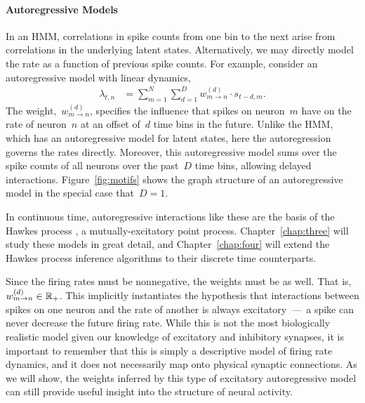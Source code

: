 \paragraph{Autoregressive Models}
In an HMM, correlations in spike counts from one bin to the next arise from 
correlations in the underlying latent states. Alternatively, we may directly 
model the rate as a function of previous spike counts. For example, consider 
an autoregressive model with linear dynamics,
\begin{align}
  \label{eq:ar_model}
  \lambda_{t,n} &= \sum_{m=1}^N \sum_{d=1}^D w_{m \to n}^{(d)} \cdot s_{t-d, m}.
\end{align}
The weight,~$w_{m \to n}^{(d)}$, specifies the influence that spikes
on neuron~$m$ have on the rate of neuron~$n$ at an offset of~$d$ time bins
in the future. 
Unlike the HMM, which has an
autoregressive model for latent states, here the
autoregression governs the rates directly.
Moreover, this
autoregressive model sums over the spike counts of all neurons over
the past~$D$ time bins, allowing delayed interactions.
Figure~\ref{fig:motifs} shows the graph structure of an autoregressive model
in the special case that~$D=1$.

In continuous time, autoregressive interactions like these are the
basis of the Hawkes process \citep{Hawkes-1971}, a mutually-excitatory
point process. Chapter~\ref{chap:three} will study these models 
in great detail, and Chapter~\ref{chap:four} will extend the Hawkes
process inference algorithms to their discrete time counterparts.

Since the firing rates must be nonnegative, the weights must be as
well.  That is,~$w_{m \to n}^{(d)} \in \mathbb{R}_+$.  This implicitly
instantiates the hypothesis that interactions between spikes on one
neuron and the rate of another is always excitatory~---~a spike can
never decrease the future firing rate.  While this is not the most
biologically realistic model given our knowledge of excitatory and
inhibitory synapses, it is important to remember that this is simply a
descriptive model of firing rate dynamics, and it does not necessarily
map onto physical synaptic connections. As we will show, the weights
inferred by this type of excitatory autoregressive model can still
provide useful insight into the structure of neural activity.

